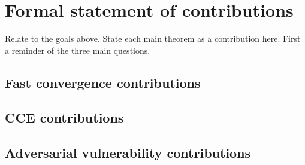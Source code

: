 \section{Formal statement of contributions}

Relate to the goals above. State each main theorem as a contribution here. First a reminder of the three main questions.

\subsection{Fast convergence contributions}

\subsection{CCE contributions}

\subsection{Adversarial vulnerability contributions}

